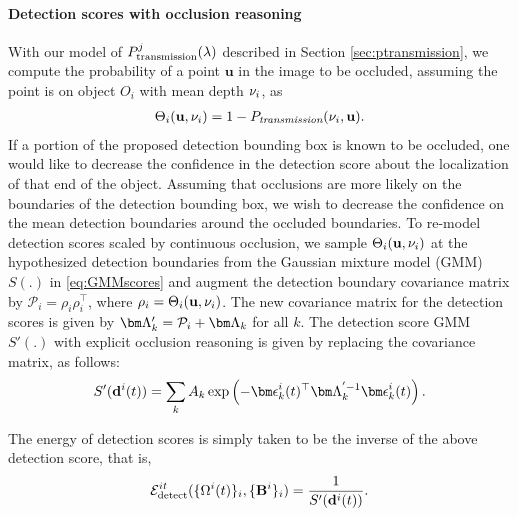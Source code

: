 \paragraph{Detection scores with occlusion reasoning} 
\def\u{\mathbf{u}}
With our model of $P^{j}_{\text{transmission}}(\lambda)$ described in Section \ref{sec:ptransmission}, we 
compute the probability of a point $\u$ in the image to be occluded, assuming
the point is on object $O_i$ with mean depth $\nu_i$, as
\begin{align}
  \Theta_{i}(\u, \meandepth{i}) = 1 - \Ptransmission(\meandepth{i}, \u).
\end{align}
If a portion of the proposed detection bounding box is known to be 
occluded, one would like to decrease the confidence in the detection score 
about the localization of that end of the object. Assuming that occlusions 
are more likely on the boundaries of the detection bounding box, we wish to decrease the 
confidence on the mean detection boundaries around the occluded boundaries.
To re-model detection scores scaled by continuous occlusion, we sample
$\Theta_{i}(\mathbf{u}, \nu_i)$ at the hypothesized detection boundaries from
the Gaussian mixture model (GMM) $S(.)$ in \eqref{eq:GMMscores} and augment the detection boundary covariance matrix by
$\mathcal{P}_{i} = \rho_{i}\rho_{i}^\top$, where $\rho_{i} = \Theta_{i}(\mathbf{u},
\nu_i)$. The new covariance matrix for the detection scores is given by 
  $\bLambda'_k = \mathcal{P}_{i} + \bLambda_k$ for all $k$.
The detection score GMM $S'(.)$ with explicit occlusion reasoning is given by replacing the covariance
matrix, as follows:
%
\begin{align}
S'(\bb{i}) = \sum_k A_k \exp \left( -\bepsilon_k^{i}(t)^\top \bLambda_k^{'-1} \bepsilon_k^{i}(t) \right).
\end{align}

The energy of detection scores is simply taken to be the inverse of the above detection score, that is,
\begin{align}
  \mathcal{E}^{it}_{\text{detect}}(\{ \Omega^{i}(t) \}_i, \{\mathbf{B}^{i}\}_i ) = \frac{1}{S'(\mathbf{d}^{i}(t))}.
\end{align}


